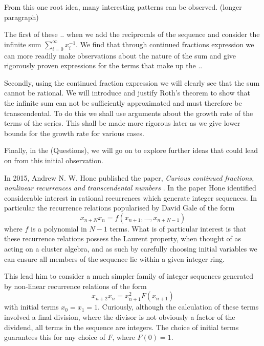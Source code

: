 \documentclass{article}
\theoremstyle{remark}
\theoremstyle{definition}
\begin{document}
From this one root idea, many interesting patterns can be observed. (longer paragraph)

The first of these .. when we add the reciprocals of the sequence and consider the infinite sum $\sum_{i=0}^\infty x_i^{-1}$. We find that through continued fractions expression we can more readily make observations about the nature of the sum and give rigorously proven expressions for the terms that make up the ..

Secondly, using the continued fraction expression we will clearly see that the sum cannot be rational. We will introduce and justify Roth's theorem to show that the infinite sum can not be sufficiently approximated and must therefore be transcendental. To do this we shall use arguments about the growth rate of the terms of the series. This shall be made more rigorous later as we give lower bounds for the growth rate for various cases.

Finally, in the (Questions), we will go on to explore further ideas that could lead on from this initial observation.
\fi

In 2015, Andrew N. W. Hone published the paper, \textit{Curious continued fractions, nonlinear recurrences and transcendental numbers} \cite{hone2015curious}. In the paper Hone identified considerable interest in rational recurrences which generate integer sequences. In particular the recurrence relations popularised by David Gale \cite{gale1991strange} of the form
\begin{equation}
    x_{n+N} x_{n} = f(x_{n+1},\dots,x_{n+N-1})
\end{equation}
where $f$ is a polynomial in $N - 1$ terms. What is of particular interest is that these recurrence relations possess the Laurent property, when thought of as acting on a cluster algebra, and as such by carefully choosing initial variables we can ensure all members of the sequence lie within a given integer ring.

This lead him to consider a much simpler family of integer sequences generated by non-linear recurrence relations of the form
\begin{equation}
    x_{n+2} x_{n} = x_{n+1}^2 F(x_{n+1})
\end{equation}
with initial terms $x_0=x_1=1$. Curiously, although the calculation of these terms involved a final division, where the divisor is not obviously a factor of the dividend, all terms in the sequence are integers. The choice of initial terms guarantees this for any choice of $F$, where $F(0)=1$.
\end{document}

